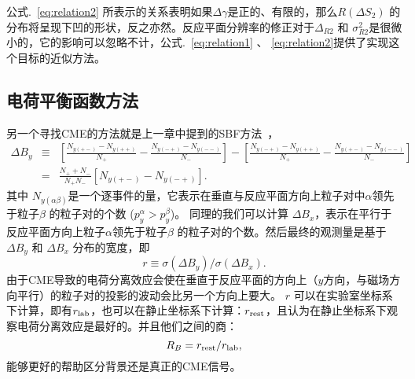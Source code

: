 公式.~\ref{eq:relation2} 所表示的关系表明如果$\Delta\gamma$是正的、有限的，那么$R(\Delta S_2)$ 的分布将呈现下凹的形状，反之亦然。反应平面分辨率的修正对于$\Delta_{R2}$ 和 $\sigma^2_{R2}$是很微小的，它的影响可以忽略不计，公式.~\ref{eq:relation1} 、 \ref{eq:relation2}提供了实现这个目标的近似方法。




\subsection{电荷平衡函数方法}

另一个寻找CME的方法就是上一章中提到的SBF方法~\cite{Tang2019}，
\begin{eqnarray}
\Delta B_y 
&\equiv& [\frac{N_{y(+-)}-N_{y(++)}}{N_+} - \frac{N_{y(-+)}-N_{y(--)}}{N_-}] - [\frac{N_{y(-+)}-N_{y(++)}}{N_+} - \frac{N_{y(+-)}-N_{y(--)}}{N_-}] \nonumber \\
&=& \frac{N_+ + N_-}{N_+N_-}[N_{y(+-)} - N_{y(-+)}].
\label{eq:by}
\end{eqnarray}
其中 $N_{y(\alpha\beta)}$是一个逐事件的量，它表示在垂直与反应平面方向上粒子对中$\alpha$领先于粒子$\beta$ 的粒子对的个数 ($p_y^\alpha > p_y^\beta$)。
同理的我们可以计算 $\Delta B_x$，表示在平行于反应平面方向上粒子$\alpha$领先于粒子$\beta$ 的粒子对的个数。然后最终的观测量是基于$\Delta B_y$ 和 $\Delta B_x$ 分布的宽度，即
\begin{equation}
r \equiv \sigma(\Delta B_y) / \sigma(\Delta B_x).
\label{rlab}
\end{equation}
由于CME导致的电荷分离效应会使在垂直于反应平面的方向上（$y$方向，与磁场方向平行）的粒子对的投影的波动会比另一个方向上要大。
$r$ 可以在实验室坐标系下计算，即有$r_{\rm lab}$，也可以在静止坐标系下计算：$r_{\rm rest}$，且认为在静止坐标系下观察电荷分离效应是最好的。并且他们之间的商：
\begin{equation}
R_B = r_{\rm rest} / r_{\rm lab},
\end{equation}
能够更好的帮助区分背景还是真正的CME信号。


